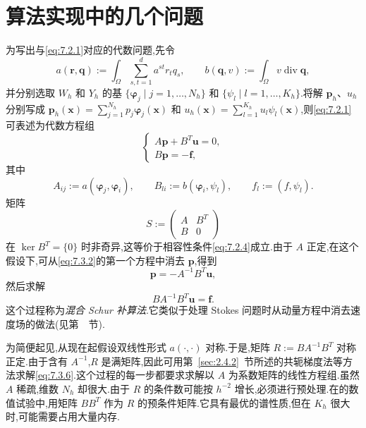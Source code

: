 \clearpage
\section{算法实现中的几个问题}\label{sec:7.3}

为写出与\eqref{eq:7.2.1}对应的代数问题,先令
\begin{equation}\label{eq:7.3.1}
  a(\boldsymbol{r},\boldsymbol{q}):=\int_\Omega\sum_{s,t=1}^d a^{st}r_tq_s,\qquad
  b(\boldsymbol{q},v):=\int_\Omega v\operatorname{div}\boldsymbol{q},
\end{equation}
并分别选取 \(W_h\) 和 \(Y_h\) 的基 \(\{\boldsymbol{\varphi}_j\mid j=1,\ldots,N_h\}\) 和 \(\{\psi_l\mid l=1,\ldots,K_h\}\).将解 \(\boldsymbol{p}_h\)、\(u_h\) 分别写成
\(\boldsymbol{p}_h(\boldsymbol{x})=\sum_{j=1}^{N_h}p_j\boldsymbol{\varphi}_j(\boldsymbol{x})\) 和
\(u_h(\boldsymbol{x})=\sum_{l=1}^{K_h}u_l\psi_l(\boldsymbol{x})\),则\eqref{eq:7.2.1}可表述为代数方程组
\begin{equation}\label{eq:7.3.2}
  \begin{cases}
    A\boldsymbol{p}+B^T\boldsymbol{u}=0,\\
    B\boldsymbol{p}=-\boldsymbol{f},
  \end{cases}
\end{equation}
其中
\begin{equation}\label{eq:7.3.3}
  A_{ij}:=a(\boldsymbol{\varphi}_j,\boldsymbol{\varphi}_i),\qquad
  B_{li}:=b(\boldsymbol{\varphi}_i,\psi_l),\qquad f_l:=(f,\psi_l).
\end{equation}
矩阵
\begin{equation}\label{eq:7.3.4}
  S:=\begin{pmatrix} A&B^T\\ B&0\end{pmatrix}
\end{equation}
在 \(\ker B^T=\{0\}\) 时非奇异,这等价于相容性条件\eqref{eq:7.2.4}成立.由于 \(A\) 正定,在这个假设下,可从\eqref{eq:7.3.2}的第一个方程中消去 \(\boldsymbol{p}\),得到
\begin{equation}\label{eq:7.3.5}
  \boldsymbol{p}=-A^{-1}B^T\boldsymbol{u},
\end{equation}
然后求解
\begin{equation}\label{eq:7.3.6}
  BA^{-1}B^T\boldsymbol{u}=\boldsymbol{f}.
\end{equation}
这个过程称为\emph{混合 Schur 补算法}.它类似于处理 Stokes 问题时从动量方程中消去速度场的做法(见第~~节).

为简便起见,从现在起假设双线性形式 \(a(\cdot,\cdot)\) 对称.于是,矩阵 \(R:=BA^{-1}B^T\) 对称正定.由于含有 \(A^{-1}\),\(R\) 是满矩阵,因此可用第~\ref{sec:2.4.2}~节所述的共轭梯度法等方法求解\eqref{eq:7.3.6}.这个过程的每一步都要求求解以 \(A\) 为系数矩阵的线性方程组.虽然 \(A\) 稀疏,维数 \(N_h\) 却很大.由于 \(R\) 的条件数可能按 \(h^{-2}\) 增长,必须进行预处理.在的数值试验中,用矩阵 \(BB^T\) 作为 \(R\) 的预条件矩阵.它具有最优的谱性质,但在 \(K_h\) 很大时,可能需要占用大量内存.

